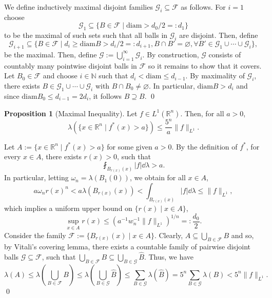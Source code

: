 \documentclass[
]{article}
\theoremstyle{definition}
\newtheorem{prop}{Proposition}
\theoremstyle{definition}
\begin{document}
We define inductively maximal disjoint families
\(\mathcal{G}_i \subseteq \mathcal{F}\) as follows. For \(i = 1\) choose
\[\mathcal{G}_1 \subseteq \{B \in \mathcal{F} \mid \text{diam} > d_0 / 2 =: d_1\}\]
to be the maximal of such sets such that all balls in \(\mathcal{G}_i\)
are disjoint. Then, define
\[\mathcal{G}_{i + 1} \subseteq \{B \in \mathcal{F} \mid d_i \ge \text{diam} B > d_i / 2 
    =: d_{i + 1}, B \cap B' = \varnothing, \forall B' \in \mathcal{G}_1 \cup \cdots \cup 
    \mathcal{G}_i\},\] be the maximal. Then, define
\(\mathcal{G} := \bigcup_{i = 1}^\infty \mathcal{G}_i\). By
construction, \(\mathcal{G}\) consists of countably many pointwise
disjoint balls in \(\mathcal{F}\) so it remains to show that it covers.
Let \(B_0 \in \mathcal{F}\) and choose \(i \in \mathbb{N}\) such that
\(d_i < \text{diam} \le d_{i - 1}\). By maximality of \(\mathcal{G}_i\),
there exists \(B \in \mathcal{G}_1 \cup \cdots \cup  \mathcal{G}_i\)
with \(B \cap B_0 \neq \varnothing\). In particular,
\(\text{diam} B > d_i\) and since
\(\text{diam} B_0 \le d_{i - 1} = 2d_i\), it follows
\(\hat B \supseteq B\). \qed

\begin{prop}[Maximal Inequality]
  Let \(f \in L^1(\mathbb{R}^n)\). Then, for all \(a > 0\), 
  \[\lambda(\{x \in \mathbb{R}^n \mid f^*(x) > a\}) \le \frac{5^n}{a} \|f\|_{L^1}.\]
\end{prop}
\proof

Let \(A := \{x \in \mathbb{R}^n \mid f^*(x) > a\}\) for some given
\(a > 0\). By the definition of \(f^*\), for every \(x \in A\), there
exists \(r(x) > 0\), such that
\[\fint_{B_{r(x)}(x)} |f| \dd \lambda > a.\] In particular, letting
\(\omega_n = \lambda(B_1(0))\), we obtain for all \(x \in A\),
\[a \omega_n r(x)^n < a \lambda(B_{r(x)}(x)) < \int_{B_{r(x)}(x)} |f| \dd \lambda 
    \le \|f\|_{L^1},\] which implies a uniform upper bound on
\(\{r(x) \mid x \in A\}\),
\[\sup_{x \in A} r(x) \le (a^{-1} w_n^{-1} \|f\|_{L^1})^{1 / n} =: \frac{d_0}{2}.\]
Consider the family \(\mathcal{F} := \{B_{r(x)}(x) \mid x \in A\}\).
Clearly, \(A \subseteq \bigcup_{B \in \mathcal{F}} B\) and so, by
Vitali's covering lemma, there exists a countable family of pairwise
disjoint balls \(\mathcal{G} \subseteq \mathcal{F}\), such that
\(\bigcup_{B \in \mathcal{F}} B \subseteq \bigcup_{B \in \mathcal{G}} \hat B\).
Thus, we have
\[\lambda(A) \le \lambda \left(\bigcup_{B \in \mathcal{F}} B\right) 
  \le \lambda\left(\bigcup_{B \in \mathcal{G}} \hat B\right) \le 
  \sum_{B \in \mathcal{G}} \lambda(\hat B) = 5^n  \sum_{B \in \mathcal{G}} \lambda(B) 
  < 5^n \|f\|_{L^1}.\] \qed
\end{document}
